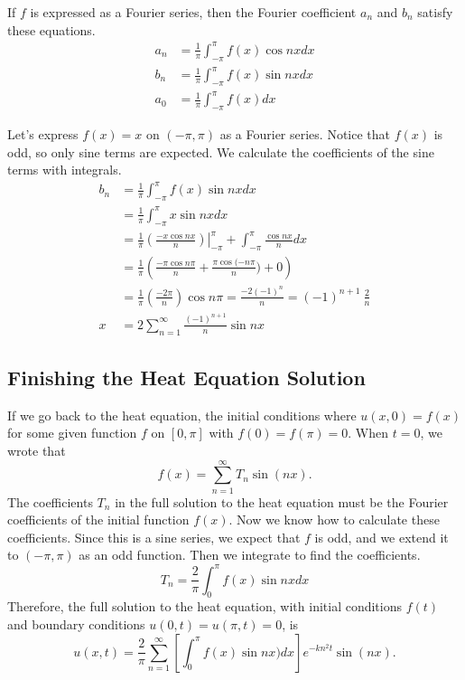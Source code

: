 \documentclass[fleqn,letterpaper]{report}
\begin{document}
\begin{prop}
If $f$ is expressed as a Fourier series, then the Fourier
coefficient $a_n$ and $b_n$ satisfy these equations.
\begin{align*}
a_n & = \frac{1}{\pi} \int_{-\pi}^\pi f(x) \cos nx dx \\
b_n & = \frac{1}{\pi} \int_{-\pi}^\pi f(x) \sin nx dx \\
a_0 & = \frac{1}{\pi} \int_{-\pi}^\pi f(x) dx
\end{align*}
\end{prop}

\begin{example}
Let's express $f(x) = x$ on $(-\pi, \pi)$ as a
Fourier series. Notice that $f(x)$ is odd, so only sine terms
are expected. We calculate the coefficients of the sine terms
with integrals.
\begin{align*}
b_n & = \frac{1}{\pi} \int_{-\pi}^\pi f(x) \sin nx dx \\
& = \frac{1}{\pi} \int_{-\pi}^\pi x \sin nx dx \\
& = \frac{1}{\pi} \left. \left( \frac{-x\cos nx}{n} \right)
\right|_{-\pi}^\pi + \int_{-\pi}^\pi \frac{\cos nx}{n} dx \\
& = \frac{1}{\pi} \left( \frac{ -\pi \cos n \pi }{n} + \frac{\pi
\cos (-n\pi}{n}) + 0 \right) \\
& = \frac{1}{\pi} \left( \frac{-2\pi}{n} \right) \cos n\pi =
\frac{-2(-1)^n}{n} = (-1)^{n+1}\ \frac{2}{n}\\
x & = 2 \sum_{n=1}^\infty \frac{(-1)^{n+1}}{n} \sin nx
\end{align*}
\end{example}

\subsection{Finishing the Heat Equation Solution}
\label{finishing-heat-equation}

If we go back to the heat equation, the initial conditions where
$u(x,0) = f(x)$ for some given function $f$ on $[0, \pi]$ with
$f(0) = f(\pi) = 0$. When $t=0$, we wrote that 
\begin{equation*}
f(x) = \sum_{n=1}^\infty T_n \sin (nx).
\end{equation*}
The coefficients $T_n$ in the full solution to the heat
equation must be the Fourier coefficients of the initial 
function $f(x)$. Now we know how to calculate these coefficients.
Since this is a sine series, we expect that $f$ is odd, and we
extend it to $(-\pi,\pi)$ as an odd function. Then we
integrate to find the coefficients.
\begin{equation*}
T_n = \frac{2}{\pi} \int_0^\pi f(x) \sin nx dx
\end{equation*}
Therefore, the full solution to the heat equation, with
initial conditions $f(t)$ and boundary conditions $u(0,t) =
u(\pi,t) = 0$, is
\begin{equation*}
u(x,t) = \frac{2}{\pi} \sum_{n=1}^\infty \left[ \int_0^\pi f(x)
\sin nx) dx \right] e^{-kn^2t} \sin (nx).
\end{equation*}
\end{document}
